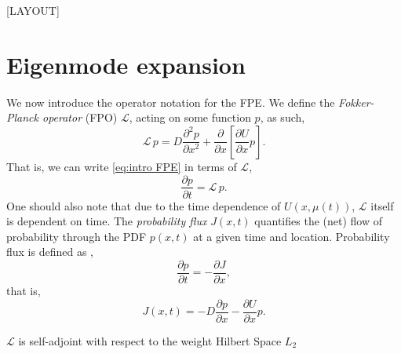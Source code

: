 \documentclass[11pt]{amsart}
\begin{document}
[LAYOUT]

\section{Eigenmode expansion}
We now introduce the operator notation for the FPE. We define the \emph{Fokker-Planck operator} (FPO) $\mathcal{L}$, acting on some function $p$, as such,
\begin{equation}
    \label{eq:fokker-planck operator}
    \mathcal{L}\,p = D\frac{\partial^2p}{\partial x^2}+\frac{\partial}{\partial x}\left[\frac{\partial U}{\partial x}p\right]. 
\end{equation}
That is, we can write \cref{eq:intro FPE} in terms of $\mathcal{L}$,
\begin{equation}
    \label{eq:fokker-planck operator time partial derivative}
    \frac{\partial p}{\partial t} = \mathcal{L}\,p.
\end{equation}
One should also note that due to the time dependence of $U(x,\mu(t))$, $\mathcal{L}$ itself is dependent on time. The \emph{probability flux} $J(x,t)$ quantifies the (net) flow of probability through the PDF $p(x,t)$ at a given time and location. Probability flux is defined as \cite{risken_frank_1992_fokker_planck_equation},
\begin{equation*}
    \label{eq:fokker-planck operator with current}
    \frac{\partial p}{\partial t} = -\frac{\partial J}{\partial x},
\end{equation*}
that is, 
\begin{equation}
    \label{eq:current of FPE}
    J(x,t) = -D\frac{\partial p}{\partial x}-\frac{\partial U}{\partial x}p.
\end{equation}

$\mathcal{L}$ is self-adjoint with respect to the weight Hilbert Space $L_2$
\end{document}

